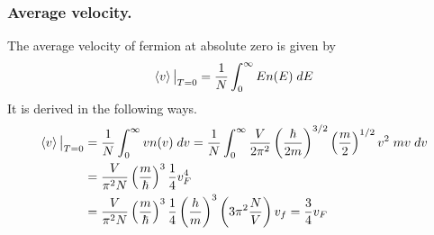 \documentclass[../../../Main.tex]{subfiles}
\begin{document}
\subsubsection*{Average velocity.} The average velocity of fermion at absolute zero is given by 
\begin{equation*}
    \braket{v}\big|_{T=0}= \frac{1}{N}\int_{0}^{\infty}En(E)\;dE 
\end{equation*}
It is derived in the following ways.
\begin{align*}
    \braket{v}\big|_{T=0}&=\frac{1}{N}\int_{0}^{\infty}vn(v)\;dv=\frac{1}{N}\int_{0}^{\infty} \frac{V}{2\pi^2}\left(\frac{\hbar}{2m}\right)^{3/2}\left(\frac{m}{2}\right)^{1/2}v^2\;mv\;dv\\
    &=\frac{V}{\pi^2N}\left(\frac{m}{\hbar}\right)^3\frac{1}{4}v_F^4\\
    &=\frac{V}{\pi^2N}\left(\frac{m}{\hbar}\right)^3\frac{1}{4} \left(\frac{h}{m}\right)^3\left(3\pi^2\frac{N}{V}\right)v_f=\frac{3}{4}v_F
\end{align*}
\end{document}
